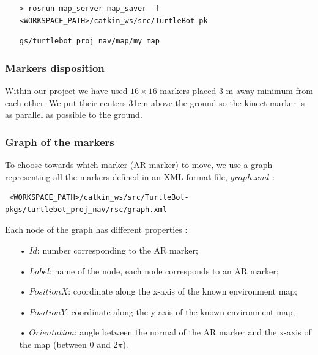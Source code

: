\documentclass[10pt,a4paper]{article}
\begin{document}
\begin{itemize}
\item[]  \begin{verbatim}> rosrun map_server map_saver -f <WORKSPACE_PATH>/catkin_ws/src/TurtleBot-pk\end{verbatim}
\item[]  \begin{verbatim}gs/turtlebot_proj_nav/map/my_map\end{verbatim}
\end{itemize}

\subsubsection{Markers disposition}
 
Within our project we have used  $16 \times 16$ markers placed 3 m away minimum from each other. We put their centers 31cm above the ground so the kinect-marker is as parallel as possible to the ground.\\

\subsubsection{Graph of the markers}
\label{sec:graphOfTheMarkers}

To choose towards which marker (AR marker) to move, we use a graph representing all the markers defined in an XML format file, $graph.xml$ :

\begin{verbatim} <WORKSPACE_PATH>/catkin_ws/src/TurtleBot-pkgs/turtlebot_proj_nav/rsc/graph.xml\end{verbatim}

Each node of the graph has different properties :

\begin{itemize}
\item[•] $Id$: number corresponding to the AR marker;
\item[•] $Label$: name of the node, each node corresponds to an AR marker;
\item[•] $PositionX$: coordinate along the x-axis of the known environment map;
\item[•] $PositionY$: coordinate along the y-axis of the known environment map;
\item[•] $Orientation$: angle between the normal of the AR marker and the x-axis of the map (between 0 and 2$\pi$).
\end{itemize}
\end{document}
